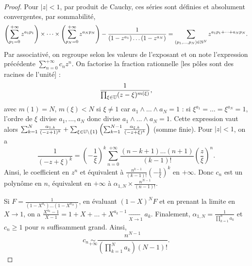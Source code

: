 \documentclass[12pt]{article}
\begin{document}
\begin{proof}
    Pour $\left\lvert z\right\rvert<1$, par produit de Cauchy, ces séries sont définies et absolument convergentes, par sommabilité,
    \begin{equation}
        \left(\sum_{p_1=0}^{+\infty}z^{a_1 p_1}\right)\times\dots\times\left(\sum_{p_N=0}^{+\infty}z^{a_Np_N}\right)-\frac{1}{(1-z^{a_1})\dots(1-z^{a_N})}=\sum_{(p_1,\dots,p_N)\in\mathbb{N}^{N}}z^{a_1p_1+\dots+a_Np_N}.
    \end{equation}
    Par associativé, on regroupe selon les valeurs de l'exposant et on note l'expression précédente $\sum_{n=0}^{+\infty}c_nz^{n}$. On factorise la fraction rationnelle [les pôles sont des racines de l'unité] :
    \begin{equation}
        \frac{1}{\prod_{\xi\in\mathbb{U}}(z-\xi)^{m\left(\xi\right)}},
    \end{equation}
    avec $m(1)=N$, $m\left(\xi\right)<N$ si $\xi\neq1$ car $a_1\wedge\dots\wedge a_N=1$ : si $\xi^{a_1}=\dots=\xi^{a_N}=1$, l'ordre de $\xi$ divise $a_1,\dots,a_N$ donc divise $a_1\wedge\dots\wedge a_N=1$. Cette expression vaut alors 
    $\sum_{k=1}^{N}\frac{\alpha_{1,k}}{(-z+1)^{k}}+\sum_{\xi\in\mathbb{U}\setminus\left\lbrace1\right\rbrace}\left(\sum_{k=1}^{N-1}\frac{\alpha_{\xi,k}}{(-z+\xi)^{k}}\right)$ (somme finie). Pour $\left\lvert z\right\rvert<1$, on a 
    \begin{equation}
        \frac{1}{\left(-z+\xi\right)^{k}}=\left(-\frac{1}{\xi}\right)^{k}\sum_{n=0}^{+\infty}\frac{(n-k+1)\dots(n+1)}{(k-1)!}\left(\frac{z}{\xi}\right)^{n}.
    \end{equation}
    Ainsi, le coefficient en $z^{n}$ et équivalent à $\frac{n^{k-1}}{(k-1)!}\left(-\frac{1}{\xi}\right)^{k}$ en $+\infty$. Donc $c_n$ est un polynôme en $n$, équivalent en $+\infty$ à $\alpha_{1,N}\times \frac{n^{N-1}}{(n-1)!}$.

    Si $F=\frac{1}{(1-X^{a_1})\dots (1-X^{a_N})}$, en évaluant $(1-X)^{N}F$ et en prenant la limite en $X\to 1$, on a $\frac{X^{a_k}-1}{X-1}=1+X+\dots+X^{a_k-1}\xrightarrow[X\to1]{}a_k$. Finalement, $\alpha_{1,N}=\frac{1}{\prod_{k=1}^{n}a_k}$ et $c_n\geqslant1$ pour $n$ suffisamment grand. Ainsi,
    \begin{equation}
        \boxed{
            c_n\underset{+\infty}{\sim}\frac{n^{N-1}}{\left(\prod_{k=1}^{N}a_k\right)(N-1)!}.
        }
    \end{equation}
\end{proof}
\end{document}
